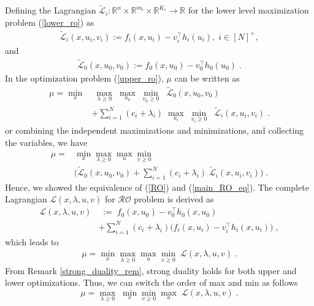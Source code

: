 \documentclass[journal,twoside,web]{ieeecolor}
\begin{document}
Defining the Lagrangian $\tilde{\mathcal{L}}_i:\mathbb{R}^n \times \mathbb{R}^{m_i} \times \mathbb{R}^{K_i} \rightarrow \mathbb{R}$ for the lower level maximization problem (\ref{lower_ro}) as
\begin{align} \label{lower_lag}
\tilde{\mathcal{L}}_i(x,u_i,v_i):=f_i(x,u_i)-v_i^\top h_{i}(u_i),\;i\in[N]^+,
\end{align}
and
\begin{align} \label{upper_lag}
\tilde{\mathcal{L}}_0(x,u_0,v_0):=f_0(x,u_0)-v_0^\top h_{0}(u_0)\;.
\end{align}
In the optimization problem (\ref{upper_ro}), $\mu$ can be written as
\begin{align} \label{main_RO_eq}
\mu=\underset{x}{\min}&\;\underset{\lambda\geq 0}{\max}\;\underset{u_0}{\max}\;\underset{v_0\geq 0}{\min}\;\; \tilde{\mathcal{L}}_0(x,u_0,v_0)\nonumber\\
&+\sum_{i=1}^N (c_i+\lambda_i)\; \underset{u_i}{\max}\;\underset{v_{i}\geq 0}{\min}\;\;\tilde{\mathcal{L}}_i(x,u_i,v_i)\;.
\end{align}
or combining the independent maximizations and minimizations, and collecting the variables, we have
\begin{align}\label{main_RO2_eq}
\mu=&\min_{x}\max_{\lambda\geq 0}\max_{u}\min_{v\geq 0} \nonumber\\
&\big(\tilde{\mathcal{L}}_0(x,u_0,v_0)+\sum_{i=1}^N (c_i+\lambda_i) \; \tilde{\mathcal{L}}_i(x,u_i,v_i)\big)\;.
\end{align}
Hence, we showed the equivalence of (\ref{RO}) and (\ref{main_RO_eq}).
The complete Lagrangian $\mathcal{L}(x,\lambda,u,v)$ for $\mathcal{RO}$ problem is derived as
\begin{align}
\mathcal{L}(x,\lambda,u,v)&\;:=\;f_0(x,u_0)-v_0^\top h_0(x,u_0)\nonumber\\
&+\sum_{i=1}^N (c_i+\lambda_i)\big(f_i(x,u_i)-v_i^\top h_i(x,u_i)\big)\;,
\label{lag}
\end{align}
which leads to
\begin{align*}
\mu=\min_{x}\max_{\lambda\geq 0}\max_{u}\min_{v\geq 0}\;\mathcal{L}(x,\lambda,u,v)\;.
\end{align*}
From Remark \ref{strong_duality_rem}, strong duality holds for both upper and lower optimizations. Thus, we can switch the order of max and min as follows
\begin{equation}\label{dual.eq}
\mu=\max_{\lambda\geq 0}\;\min_{x}\min_{v\geq 0} \max_{u}\;\mathcal{L}(x,\lambda,u,v)\;.
\end{equation}
\end{document}
